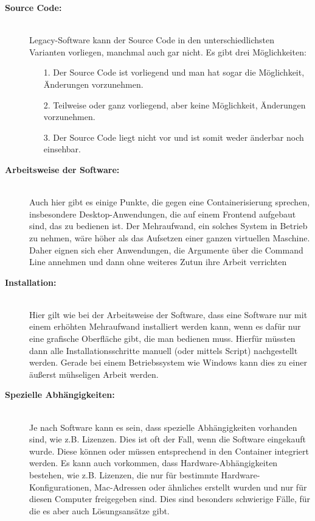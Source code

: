 \begin{description}
	\item[\textbf{Source Code:}]\hfill \\ Legacy-Software kann der Source Code in den unterschiedlichsten Varianten vorliegen, manchmal auch gar nicht. Es gibt drei Möglichkeiten: \\
	\begin{itemize}
		\item[1.] Der Source Code ist vorliegend und man hat sogar die Möglichkeit, Änderungen vorzunehmen. \\
		\item[2.] Teilweise oder ganz vorliegend, aber keine Möglichkeit, Änderungen vorzunehmen. \\
		\item[3.] Der Source Code liegt nicht vor und ist somit weder änderbar noch einsehbar.
			\\
	\end{itemize}
	\item[\textbf{Arbeitsweise der Software:}]\hfill \\ Auch hier gibt es einige Punkte, die gegen eine Containerisierung sprechen, insbesondere Desktop-Anwendungen, die auf einem Frontend aufgebaut sind, das zu bedienen ist. Der Mehraufwand, ein solches System in Betrieb zu nehmen, wäre höher als das Aufsetzen einer ganzen virtuellen Maschine. Daher eignen sich eher Anwendungen, die Argumente über die Command Line annehmen und dann ohne weiteres Zutun ihre Arbeit verrichten \\
	\item[\textbf{Installation:}]\hfill \\ Hier gilt wie bei der Arbeitsweise der Software, dass eine Software nur mit einem erhöhten Mehraufwand installiert werden kann, wenn es dafür nur eine grafische Oberfläche gibt, die man bedienen muss. Hierfür müssten dann alle Installationsschritte manuell (oder mittels Script) nachgestellt werden. Gerade bei einem Betriebssystem wie Windows kann dies zu einer äußerst mühseligen Arbeit werden.\\
	\item[\textbf{Spezielle Abhängigkeiten:}]\hfill \\ Je nach Software kann es sein, dass spezielle Abhängigkeiten vorhanden sind, wie z.B.  Lizenzen. Dies ist oft der Fall, wenn die Software eingekauft wurde. Diese können oder müssen entsprechend in den Container integriert werden. Es kann auch vorkommen, dass Hardware-Abhängigkeiten bestehen, wie z.B. Lizenzen, die nur für bestimmte Hardware-Konfigurationen, Mac-Adressen oder ähnliches erstellt wurden und nur für diesen Computer freigegeben sind. Dies sind besonders schwierige Fälle, für die es aber auch Lösungsansätze gibt. \\ \\


\end{description}
